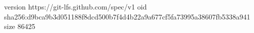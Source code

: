 version https://git-lfs.github.com/spec/v1
oid sha256:d9bca9b3d051188f8dcd500b7f4d4b22a9a677cf5fa73995a38607fb5338a941
size 86425
